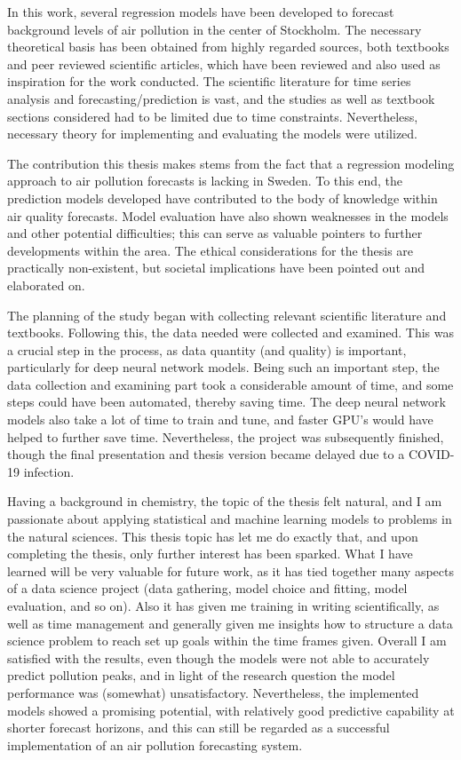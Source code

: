 In this work, several regression models have been developed to forecast background levels of air pollution in the center of Stockholm. The necessary theoretical basis has been obtained from highly regarded sources, both textbooks and peer reviewed scientific articles, which have been reviewed and also used as inspiration for the work conducted. The scientific literature for time series analysis and forecasting/prediction is vast, and the studies as well as textbook sections considered had to be limited due to time constraints. Nevertheless, necessary theory for implementing and evaluating the models were utilized. 

The contribution this thesis makes stems from the fact that a regression modeling approach to air pollution forecasts is lacking in Sweden. To this end, the prediction models developed have contributed to the body of knowledge within air quality forecasts. Model evaluation have also shown weaknesses in the models and other potential difficulties; this can serve as valuable pointers to further developments within the area. The ethical considerations for the thesis are practically non-existent, but societal implications have been pointed out and elaborated on.

The planning of the study began with collecting relevant scientific literature and textbooks. Following this, the data needed were collected and examined. This was a crucial step in the process, as data quantity (and quality) is important, particularly for deep neural network models. Being such an important step, the data collection and examining part took a considerable amount of time, and some steps could have been automated, thereby saving time. The deep neural network models also take a lot of time to train and tune, and faster GPU's would have helped to further save time. Nevertheless, the project was subsequently finished, though the final presentation and thesis version became delayed due to a COVID-19 infection. 

Having a background in chemistry, the topic of the thesis felt natural, and I am passionate about applying statistical and machine learning models to problems in the natural sciences. This thesis topic has let me do exactly that, and upon completing the thesis, only further interest has been sparked. What I have learned will be very valuable for future work, as it has tied together many aspects of a data science project (data gathering, model choice and fitting, model evaluation, and so on). Also it has given me training in writing scientifically, as well as time management and generally given me insights how to structure a data science problem to reach set up goals within the time frames given. Overall I am satisfied with the results, even though the models were not able to accurately predict pollution peaks, and in light of the research question the model performance was (somewhat) unsatisfactory. Nevertheless, the implemented models showed a promising potential, with relatively good predictive capability at shorter forecast horizons, and this can still be regarded as a successful implementation of an air pollution forecasting system.  
